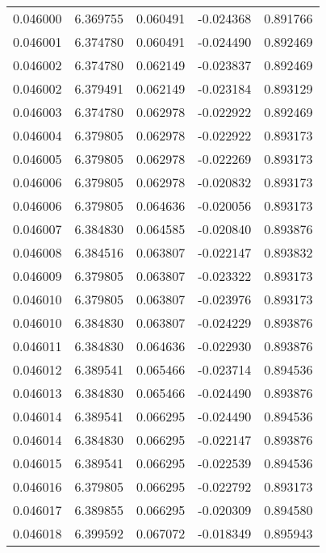 \begin{tabular}{lrrrr}
0.046000    &  6.369755 &  0.060491 & -0.024368 &             0.891766 \\
0.046001    &  6.374780 &  0.060491 & -0.024490 &             0.892469 \\
0.046002    &  6.374780 &  0.062149 & -0.023837 &             0.892469 \\
0.046002    &  6.379491 &  0.062149 & -0.023184 &             0.893129 \\
0.046003    &  6.374780 &  0.062978 & -0.022922 &             0.892469 \\
0.046004    &  6.379805 &  0.062978 & -0.022922 &             0.893173 \\
0.046005    &  6.379805 &  0.062978 & -0.022269 &             0.893173 \\
0.046006    &  6.379805 &  0.062978 & -0.020832 &             0.893173 \\
0.046006    &  6.379805 &  0.064636 & -0.020056 &             0.893173 \\
0.046007    &  6.384830 &  0.064585 & -0.020840 &             0.893876 \\
0.046008    &  6.384516 &  0.063807 & -0.022147 &             0.893832 \\
0.046009    &  6.379805 &  0.063807 & -0.023322 &             0.893173 \\
0.046010    &  6.379805 &  0.063807 & -0.023976 &             0.893173 \\
0.046010    &  6.384830 &  0.063807 & -0.024229 &             0.893876 \\
0.046011    &  6.384830 &  0.064636 & -0.022930 &             0.893876 \\
0.046012    &  6.389541 &  0.065466 & -0.023714 &             0.894536 \\
0.046013    &  6.384830 &  0.065466 & -0.024490 &             0.893876 \\
0.046014    &  6.389541 &  0.066295 & -0.024490 &             0.894536 \\
0.046014    &  6.384830 &  0.066295 & -0.022147 &             0.893876 \\
0.046015    &  6.389541 &  0.066295 & -0.022539 &             0.894536 \\
0.046016    &  6.379805 &  0.066295 & -0.022792 &             0.893173 \\
0.046017    &  6.389855 &  0.066295 & -0.020309 &             0.894580 \\
0.046018    &  6.399592 &  0.067072 & -0.018349 &             0.895943 \\

\end{tabular}
